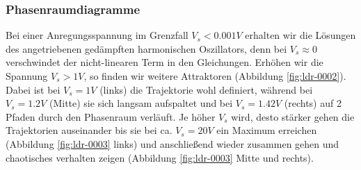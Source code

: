 \documentclass[11,5pt, twoside]{article}
\begin{document}
\subsubsection{Phasenraumdiagramme}
Bei einer Anregungsspannung im Grenzfall $V_s < 0.001V$ erhalten wir die Lösungen des angetriebenen gedämpften harmonischen Oszillators, denn bei $V_s \approx 0$ verschwindet der nicht-linearen Term in den Gleichungen.
\newline
Erhöhen wir die Spannung $V_s>1V$, so finden wir weitere Attraktoren (Abbildung \ref{fig:ldr-0002}). Dabei ist bei $V_s=1V$ (links) die Trajektorie wohl definiert, während bei $V_s=1.2V$ (Mitte) sie sich langsam aufspaltet und bei $V_s=1.42V$ (rechts) auf 2 Pfaden durch den Phasenraum verläuft.
Je höher $V_s$ wird, desto stärker gehen die Trajektorien auseinander bis sie bei ca. $V_s=20V$ ein Maximum erreichen (Abbildung \ref{fig:ldr-0003} links) und anschließend wieder zusammen gehen und chaotisches verhalten zeigen (Abbildung \ref{fig:ldr-0003} Mitte und rechts).
\end{document}
